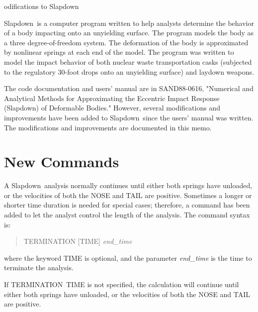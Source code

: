 \def\SLAP{{\sf Slap\-down}}
\def\slap{{\sf Slap\-down}}
\def\exo{{\sf EXODUS}}
\newcommand{\caps}[1]
   {\uppercase{#1}\null}
\newcommand{\cmd}[1]
   {\mbox{\sf\uppercase{#1}}\null}
\newcommand{\lcmd}[1]
   {\mbox{\sf#1}\null}
\newcommand{\param}[1]
   {{\em #1}\null}
\newcommand{\optparam}[1]
   {[{\em #1\/}]\null}
\newcommand{\bold}[1]
   {{\bf #1}\null}

\begin{memo}

\subject Modifications to \slap

\SLAP\ is a computer program written to help analysts determine the
behavior of a body impacting onto an unyielding surface.  The program
models the body as a three degree-of-freedom system.  The deformation of
the body is approximated by nonlinear springs at each end of the model.
The program was written to model the impact behavior of both nuclear
waste transportation casks (subjected to the regulatory 30-foot drops
onto an unyielding surface) and laydown weapons.

The code documentation and users' manual are in SAND88-0616, "Numerical
and Analytical Methods for Approximating the Eccentric Impact Response
(Slapdown) of Deformable Bodies."  However, several modifications and
improvements have been added to \slap\ since the users' manual was
written.  The modifications and improvements are documented in this
memo.

\section*{New Commands}

A \slap\ analysis normally continues until either both springs have
unloaded, or the velocities of both the \cmd{NOSE} and \cmd{TAIL} are
positive.  Sometimes a longer or shorter time duration is needed for
special cases; therefore, a command has been added to let the analyst
control the length of the analysis.  The command syntax is:
\begin{quote}
\sf TERMINATION [TIME] \em end\_time
\end{quote}
where the keyword \cmd{TIME} is optional, and the parameter
\param{end\_time} is the time to terminate the analysis.

If \cmd{TERMINATION~TIME} is not specified, the calculation will
continue until either both springs have unloaded, or the velocities of
both the \cmd{NOSE} and \cmd{TAIL} are positive.


\end{memo}
